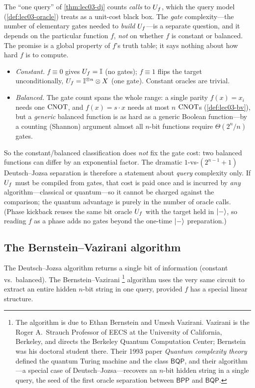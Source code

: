 \begin{remark}
\label{rem:lec03-dj-gatecost}
The ``one query'' of \cref{thm:lec03-dj} counts \emph{calls} to $U_{f}$, which the query
model (\cref{def:lec03-oracle}) treats as a unit-cost black box. The \emph{gate}
complexity---the number of elementary gates needed to \emph{build} $U_{f}$---is a separate
question, and it depends on the particular function $f$, \emph{not} on whether $f$ is
constant or balanced. The promise is a global property of $f$'s truth table; it says
nothing about how hard $f$ is to compute.
\begin{itemize}[leftmargin=1.4em,nosep]
  \item \emph{Constant.} $f\equiv0$ gives $U_{f}=\mathbb{I}$ (no gates); $f\equiv1$ flips the
        target unconditionally, $U_{f}=\mathbb{I}^{\otimes n}\otimes X$ (one gate). Constant
        oracles are trivial.
  \item \emph{Balanced.} The gate count spans the whole range: a single parity
        $f(x)=x_i$ needs one $\mathrm{CNOT}$, and $f(x)=s\cdot x$ needs at most $n$ $\mathrm{CNOT}$s
        (\cref{def:lec03-bv}), but a \emph{generic} balanced function is as hard as a
        generic Boolean function---by a counting (Shannon) argument almost all $n$-bit
        functions require $\Theta(2^n/n)$ gates.
\end{itemize}
So the constant/balanced classification does \emph{not} fix the gate cost: two balanced
functions can differ by an exponential factor. The dramatic $1$-vs-$(2^{n-1}{+}1)$
Deutsch--Jozsa separation is therefore a statement about \emph{query} complexity only. If
$U_{f}$ must be compiled from gates, that cost is paid once and is incurred by \emph{any}
algorithm---classical or quantum---so it cannot be charged against the comparison; the
quantum advantage is purely in the number of oracle calls. (Phase kickback reuses the
same bit oracle $U_{f}$ with the target held in $\ket{-}$, so reading $f$ as a phase adds
no gates beyond the one-time $\ket{-}$ preparation.)
\end{remark}

\subsection{The Bernstein--Vazirani algorithm}

The Deutsch--Jozsa algorithm returns a single bit of information (constant vs.\
balanced). The Bernstein--Vazirani%
\footnote{The algorithm is due to Ethan Bernstein and Umesh Vazirani. Vazirani is
the Roger A.\ Strauch Professor of EECS at the University of California, Berkeley,
and directs the Berkeley Quantum Computation Center; Bernstein was his doctoral
student there. Their 1993 paper \emph{Quantum complexity theory} defined the
quantum Turing machine and the class $\mathsf{BQP}$, and their algorithm---a special
case of Deutsch--Jozsa---recovers an $n$-bit hidden string in a single query, the
seed of the first oracle separation between $\mathsf{BPP}$ and $\mathsf{BQP}$.}
algorithm uses the very same circuit to extract
an entire hidden $n$-bit string in one query, provided $f$ has a special linear
structure.

